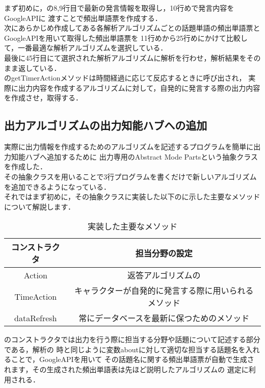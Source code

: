 まず初めに，の8,9行目で最新の発言情報を取得し，10行めで発言内容をGoogleAPIに
渡すことで頻出単語票を作成する．
\\
次にあらかじめ作成してある各解析アルゴリズムごとの話題単語の頻出単語票とGoogleAPIを用いて取得した頻出単語票を
11行めから25行めにかけて比較して，一番最適な解析アルゴリズムを選択している．
\\
最後に45行目にて選択された解析アルゴリズムに解析を行わせ，解析結果をそのまま返している．\\


のgetTimerActionメソッドは時間経過に応じて反応するときに呼び出され，
実際に出力内容を作成するアルゴリズムに対して，自発的に発言する際の出力内容を作成させ，取得する．\\



\subsection{出力アルゴリズムの出力知能ハブへの追加}
実際に出力情報を作成するためのアルゴリズムを記述するプログラムを簡単に出力知能ハブへ追加するために
出力専用のAbstract Mode Partsという抽象クラスを作成した．\\

その抽象クラスを用いることで3行プログラムを書くだけで新しいアルゴリズムを追加できるようになっている．\\

それではまず初めに，その抽象クラスに実装した以下のに示した主要なメソッドについて解説します．\\

\begin{table}[tbh]
	\caption{実装した主要なメソッド} \label{tab:parts}
	\begin{center}
		\begin{tabular}[htb]{c|c}
		\hline
		コンストラクタ & 担当分野の設定 \\
		\hline
		Action & 返答アルゴリズムの \\
		\hline
		TimeAction & キャラクターが自発的に発言する際に用いられるメソッド \\
		\hline
		dataRefresh & 常にデータベースを最新に保つためのメソッド \\
		\hline
		\end{tabular}
	\end{center}
\end{table}

のコンストラクタでは出力を行う際に担当する分野や話題について記述する部分である，解析の
時と同じように変数aboutに対して適切な担当する話題名を入れることで，GoogleAPIを用いて
その話題名に関する頻出単語票が自動で生成されます，その生成された頻出単語表は先ほど説明したアルゴリズムの
選定に利用される．\\

